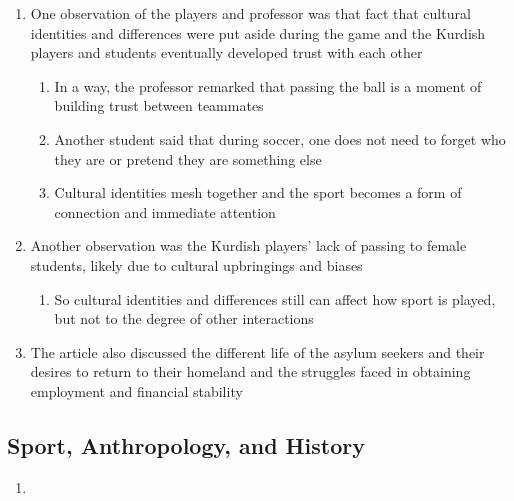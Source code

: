 \documentclass[10pt,letterpaper]{article} %
\begin{document}
\begin{enumerate}
\item One observation of the players and professor was that fact that cultural identities and differences were put aside during the game
and the Kurdish players and students eventually developed trust with each other
\begin{enumerate}
\item In a way, the professor remarked that passing the ball is a moment of building trust between teammates
\item Another student said that during soccer, one does not need to forget who they are or pretend they are something else
\item Cultural identities mesh together and the sport becomes a form of connection and immediate attention
\end{enumerate}
\item Another observation was the Kurdish players' lack of passing to female students, likely due to cultural upbringings and biases
\begin{enumerate}
\item So cultural identities and differences still can affect how sport is played, but not to the degree of other interactions
\end{enumerate}
\item The article also discussed the different life of the asylum seekers and their desires to return to their homeland and the struggles faced
in obtaining employment and financial stability
\end{enumerate}

\subsection{Sport, Anthropology, and History}
\begin{enumerate}
\item 
\end{enumerate}
\end{document}
